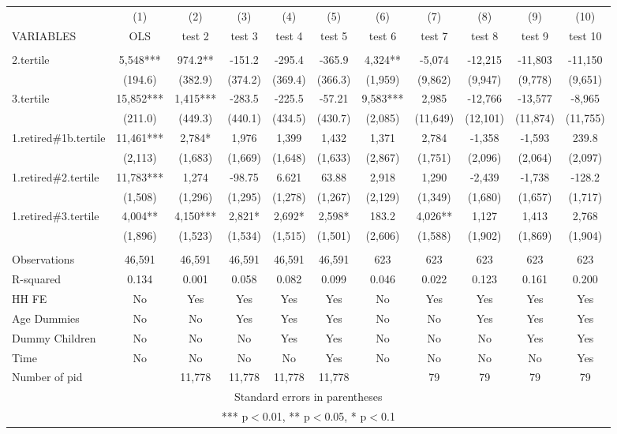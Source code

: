 \begin{tabular}{lcccccccccc} \hline
 & (1) & (2) & (3) & (4) & (5) & (6) & (7) & (8) & (9) & (10) \\
VARIABLES & OLS & test 2 & test 3 & test 4 & test 5 & test 6 & test 7 & test 8 & test 9 & test 10 \\ \hline
 &  &  &  &  &  &  &  &  &  &  \\
2.tertile & 5,548*** & 974.2** & -151.2 & -295.4 & -365.9 & 4,324** & -5,074 & -12,215 & -11,803 & -11,150 \\
 & (194.6) & (382.9) & (374.2) & (369.4) & (366.3) & (1,959) & (9,862) & (9,947) & (9,778) & (9,651) \\
3.tertile & 15,852*** & 1,415*** & -283.5 & -225.5 & -57.21 & 9,583*** & 2,985 & -12,766 & -13,577 & -8,965 \\
 & (211.0) & (449.3) & (440.1) & (434.5) & (430.7) & (2,085) & (11,649) & (12,101) & (11,874) & (11,755) \\
1.retired\#1b.tertile & 11,461*** & 2,784* & 1,976 & 1,399 & 1,432 & 1,371 & 2,784 & -1,358 & -1,593 & 239.8 \\
 & (2,113) & (1,683) & (1,669) & (1,648) & (1,633) & (2,867) & (1,751) & (2,096) & (2,064) & (2,097) \\
1.retired\#2.tertile & 11,783*** & 1,274 & -98.75 & 6.621 & 63.88 & 2,918 & 1,290 & -2,439 & -1,738 & -128.2 \\
 & (1,508) & (1,296) & (1,295) & (1,278) & (1,267) & (2,129) & (1,349) & (1,680) & (1,657) & (1,717) \\
1.retired\#3.tertile & 4,004** & 4,150*** & 2,821* & 2,692* & 2,598* & 183.2 & 4,026** & 1,127 & 1,413 & 2,768 \\
 & (1,896) & (1,523) & (1,534) & (1,515) & (1,501) & (2,606) & (1,588) & (1,902) & (1,869) & (1,904) \\
 &  &  &  &  &  &  &  &  &  &  \\
Observations & 46,591 & 46,591 & 46,591 & 46,591 & 46,591 & 623 & 623 & 623 & 623 & 623 \\
R-squared & 0.134 & 0.001 & 0.058 & 0.082 & 0.099 & 0.046 & 0.022 & 0.123 & 0.161 & 0.200 \\
HH FE & No & Yes & Yes & Yes & Yes & No & Yes & Yes & Yes & Yes \\
Age Dummies & No & No & Yes & Yes & Yes & No & No & Yes & Yes & Yes \\
Dummy Children & No & No & No & Yes & Yes & No & No & No & Yes & Yes \\
Time & No & No & No & No & Yes & No & No & No & No & Yes \\
 Number of pid &  & 11,778 & 11,778 & 11,778 & 11,778 &  & 79 & 79 & 79 & 79 \\ \hline
\multicolumn{11}{c}{ Standard errors in parentheses} \\
\multicolumn{11}{c}{ *** p$<$0.01, ** p$<$0.05, * p$<$0.1} \\
\end{tabular}
